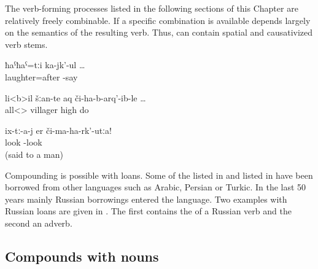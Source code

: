 The verb-forming processes listed in the following sections of this Chapter are relatively freely combinable. If a specific combination is available depends largely on the semantics of the resulting verb. Thus,  can contain spatial   and causativized verb stems.
%
\begin{exe}
	\ex	\label{ex:laughing about (me)}
	\gll	ħaˁħaˁ=tːi	ka-jk'-ul	\ldots\\
		laughter=after	-say\\
	\glt	{}

	\ex	\label{ex:all villagers were mobilized}
	\gll	li<b>il	šːan-te	aq	či-ha-b-arq'-ib-le	\ldots\\
		all<>	villager	high	do\\
	\glt	{}

	\ex	\label{ex:Do not look at them (the treesCOMPOUNDING}
	\gll	ix-tː-a-j	er	či-ma-ha-rk'-utːa!\\
			look	-look\\
	\glt	{} (said to a man)
\end{exe}

Compounding is possible with loans. Some of the  listed in  and  listed in  have been borrowed from other languages such as Arabic, Persian or Turkic. In the last 50 years mainly Russian borrowings entered the language. Two examples with Russian loans are given in . The first  contains the  of a Russian verb and the second an adverb.

%
\begin{exe}
	\ex	\label{ex:russianloancompounds}
	\begin{xlist}
		\ex	{} 
		\ex	{} 
	\end{xlist}
\end{exe}

\subsection{Compounds with nouns}
\label{ssec:compoundswithnouns}

